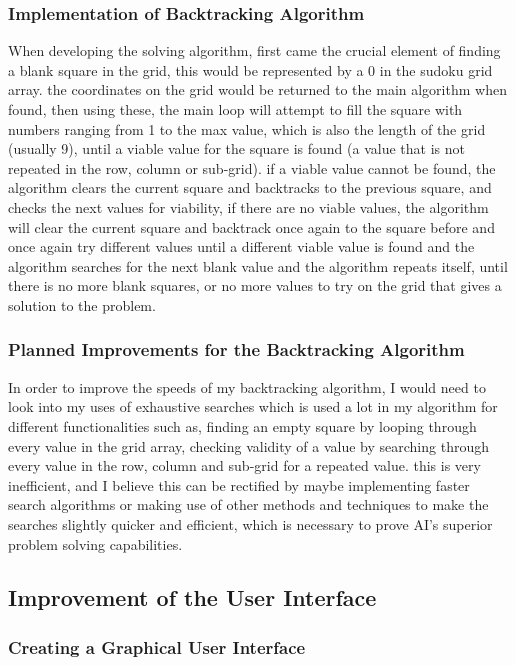 \documentclass[]{final_report}
\begin{document}
\subsubsection{Implementation of Backtracking Algorithm} 

When developing the solving algorithm, first came the crucial element of finding a blank square in the grid, this would be represented by a 0 in the sudoku grid array. the coordinates on the grid would be returned to the main algorithm when found, then using these, the main loop will attempt to fill the square with numbers ranging from 1 to the max value, which is also the length of the grid (usually 9), until a viable value for the square is found (a value that is not repeated in the row, column or sub-grid). if a viable value cannot be found, the algorithm clears the current square and backtracks to the previous square, and checks the next values for viability, if there are no viable values, the algorithm will clear the current square and backtrack once again to the square before and once again try different values until a different viable value is found and the algorithm searches for the next blank value and the algorithm repeats itself, until there is no more blank squares, or no more values to try on the grid that gives a solution to the problem. 

\subsubsection{Planned Improvements for the Backtracking Algorithm} 

In order to improve the speeds of my backtracking algorithm, I would need to look into my uses of exhaustive searches which is used a lot in my algorithm for different functionalities such as, finding an empty square by looping through every value in the grid array, checking validity of a value by searching through every value in the row, column and sub-grid for a repeated value. this is very inefficient, and I believe this can be rectified by maybe implementing faster search algorithms or making use of other methods and techniques to make the searches slightly quicker and efficient, which is necessary to prove AI's superior problem solving capabilities. 

\subsection*{Improvement of the User Interface}

\subsubsection{Creating a Graphical User Interface} 
\end{document}
